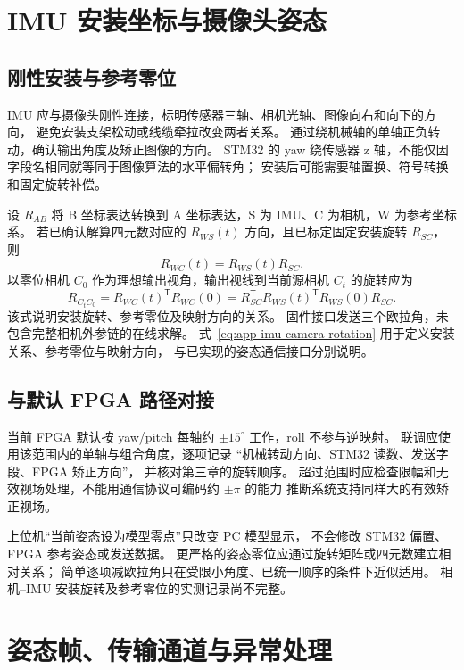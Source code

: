 \section{IMU 安装坐标与摄像头姿态}
\subsection{刚性安装与参考零位}
IMU 应与摄像头刚性连接，标明传感器三轴、相机光轴、图像向右和向下的方向，
避免安装支架松动或线缆牵拉改变两者关系。
通过绕机械轴的单轴正负转动，确认输出角度及矫正图像的方向。
STM32 的 yaw 绕传感器 z 轴，不能仅因字段名相同就等同于图像算法的水平偏转角；
安装后可能需要轴置换、符号转换和固定旋转补偿。

设 $R_{AB}$ 将 B 坐标表达转换到 A 坐标表达，S 为 IMU、C 为相机，W 为参考坐标系。
若已确认解算四元数对应的 $R_{WS}(t)$ 方向，且已标定固定安装旋转 $R_{SC}$，则
\begin{equation}
R_{WC}(t)=R_{WS}(t)R_{SC}.
\end{equation}
以零位相机 $C_0$ 作为理想输出视角，输出视线到当前源相机 $C_t$ 的旋转应为
\begin{equation}
R_{C_tC_0}=R_{WC}(t)^{\mathsf T}R_{WC}(0)
=R_{SC}^{\mathsf T}R_{WS}(t)^{\mathsf T}R_{WS}(0)R_{SC}.
\label{eq:app-imu-camera-rotation}
\end{equation}
该式说明安装旋转、参考零位及映射方向的关系。
固件接口发送三个欧拉角，未包含完整相机外参链的在线求解。
式~\eqref{eq:app-imu-camera-rotation} 用于定义安装关系、参考零位与映射方向，
与已实现的姿态通信接口分别说明。

\subsection{与默认 FPGA 路径对接}
当前 FPGA 默认按 yaw/pitch 每轴约 $\pm15^\circ$ 工作，roll 不参与逆映射。
联调应使用该范围内的单轴与组合角度，逐项记录
“机械转动方向、STM32 读数、发送字段、FPGA 矫正方向”，
并核对第三章的旋转顺序。
超过范围时应检查限幅和无效视场处理，不能用通信协议可编码约 $\pm\pi$ 的能力
推断系统支持同样大的有效矫正视场。

上位机“当前姿态设为模型零点”只改变 PC 模型显示，
不会修改 STM32 偏置、FPGA 参考姿态或发送数据。
更严格的姿态零位应通过旋转矩阵或四元数建立相对关系；
简单逐项减欧拉角只在受限小角度、已统一顺序的条件下近似适用。
相机--IMU 安装旋转及参考零位的实测记录尚不完整。

\section{姿态帧、传输通道与异常处理}
